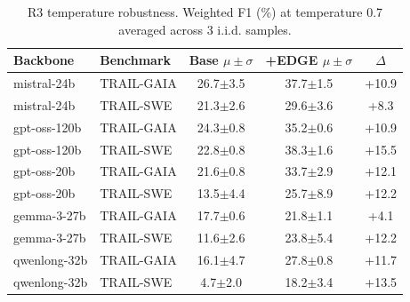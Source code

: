 \begin{table}[!tbp]
\centering \footnotesize
\begin{tabular}{l l c c c}
\toprule
\textbf{Backbone} & \textbf{Benchmark} & Base $\mu\pm\sigma$ & +EDGE $\mu\pm\sigma$ & $\Delta$ \\
\midrule
mistral-24b & TRAIL-GAIA & 26.7$\pm$3.5 & 37.7$\pm$1.5 & +10.9 \\
mistral-24b & TRAIL-SWE & 21.3$\pm$2.6 & 29.6$\pm$3.6 & +8.3 \\
gpt-oss-120b & TRAIL-GAIA & 24.3$\pm$0.8 & 35.2$\pm$0.6 & +10.9 \\
gpt-oss-120b & TRAIL-SWE & 22.8$\pm$0.8 & 38.3$\pm$1.6 & +15.5 \\
gpt-oss-20b & TRAIL-GAIA & 21.6$\pm$0.8 & 33.7$\pm$2.9 & +12.1 \\
gpt-oss-20b & TRAIL-SWE & 13.5$\pm$4.4 & 25.7$\pm$8.9 & +12.2 \\
gemma-3-27b & TRAIL-GAIA & 17.7$\pm$0.6 & 21.8$\pm$1.1 & +4.1 \\
gemma-3-27b & TRAIL-SWE & 11.6$\pm$2.6 & 23.8$\pm$5.4 & +12.2 \\
qwenlong-32b & TRAIL-GAIA & 16.1$\pm$4.7 & 27.8$\pm$0.8 & +11.7 \\
qwenlong-32b & TRAIL-SWE & 4.7$\pm$2.0 & 18.2$\pm$3.4 & +13.5 \\
\bottomrule
\end{tabular}
\caption{R3 temperature robustness. Weighted F1 (\%) at temperature 0.7 averaged across 3 i.i.d. samples.}
\label{tab:r3_temperature}
\end{table}
